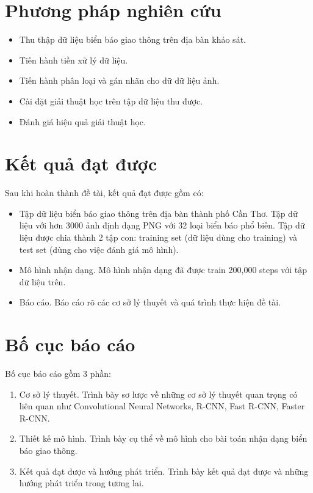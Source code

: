 \documentclass[../thesis.tex]{subfiles}
\begin{document}
\section{Phương pháp nghiên cứu}

\begin{itemize}
  \item Thu thập dữ liệu biển báo giao thông trên địa bàn khảo sát.
  \item Tiến hành tiền xử lý dữ liệu.
  \item Tiến hành phân loại và gán nhãn cho dữ dữ liệu ảnh.
  \item Cài đặt giải thuật học trên tập dữ liệu thu được.
  \item Đánh giá hiệu quả giải thuật học.
\end{itemize}

\section{Kết quả đạt được}

Sau khi hoàn thành đề tài, kết quả đạt được gồm có:

\begin{itemize}
  \item Tập dữ liệu biển báo giao thông trên địa bàn thành phố Cần Thơ. Tập dữ liệu với hơn 3000 ảnh định dạng PNG với 32 loại biển báo phổ biến. Tập dữ liệu được chia thành 2 tập con: training set (dữ liệu dùng cho training) và test set (dùng cho việc đánh giá mô hình).
  \item Mô hình nhận dạng. Mô hình nhận dạng đã được train 200,000 steps với tập dữ liệu trên.
  \item Báo cáo. Báo cáo rõ các cơ sở lý thuyết và quá trình thực hiện đề tài.
\end{itemize}

\section{Bố cục báo cáo}

Bố cục báo cáo gồm 3 phần:

\begin{enumerate}
  \item Cơ sở lý thuyết. Trình bày sơ lược về những cơ sở lý thuyết quan trọng có liên quan như Convolutional Neural Networks, R-CNN, Fast R-CNN, Faster R-CNN.
  \item Thiết kế mô hình. Trình bày cụ thể về mô hình cho bài toán nhận dạng biển báo giao thông.
  \item Kết quả đạt được và hướng phát triển. Trình bày kết quả đạt được và những hướng phát triển trong tương lai.
\end{enumerate}
\end{document}
